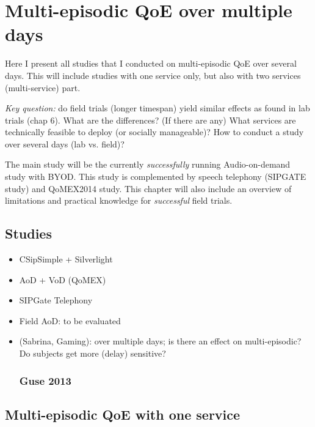 \chapter{Multi-episodic QoE over multiple days}\label{chap:07}
\begin{chapter-abstract}
Here I present all studies that I conducted on multi-episodic QoE over several days.
This will include studies with one service only, but also with two services (multi-service) part.

\textit{Key question:} do field trials (longer timespan) yield similar effects as found in lab trials (chap 6).
What are the differences? (If there are any)
What services are technically feasible to deploy (or socially manageable)?
How to conduct a study over several days (lab vs. field)?

The main study will be the currently \textit{successfully} running Audio-on-demand study with BYOD.
This study is complemented by speech telephony (SIPGATE study) and QoMEX2014 study.
This chapter will also include an overview of limitations and practical knowledge for \textit{successful} field trials.
\end{chapter-abstract}

\section{Studies}
\begin{itemize}
\item CSipSimple + Silverlight
\item AoD + VoD (QoMEX)
\item SIPGate Telephony
\item Field AoD: to be evaluated
\item (Sabrina, Gaming): over multiple days; is there an effect on multi-episodic? Do subjects get more (delay) sensitive?
\cite{guse_macro-temporal_2013} %
\subsection{Guse 2013}
\end{itemize}

\section{Multi-episodic QoE with one service}

